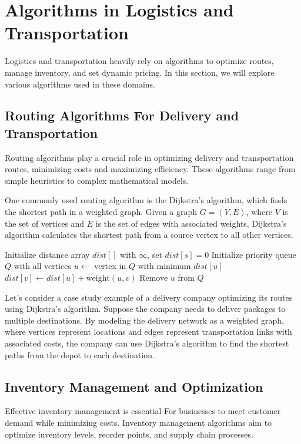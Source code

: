 \documentclass[12pt]{book} %
\begin{document}
\section{Algorithms in Logistics and Transportation}
Logistics and transportation heavily rely on algorithms to optimize routes, manage inventory, and set dynamic pricing. In this section, we will explore various algorithms used in these domains.

\subsection{Routing Algorithms For Delivery and Transportation}
Routing algorithms play a crucial role in optimizing delivery and transportation routes, minimizing costs and maximizing efficiency. These algorithms range from simple heuristics to complex mathematical models.

One commonly used routing algorithm is the Dijkstra's algorithm, which finds the shortest path in a weighted graph. Given a graph $G = (V, E)$, where $V$ is the set of vertices and $E$ is the set of edges with associated weights, Dijkstra's algorithm calculates the shortest path from a source vertex to all other vertices.
\FloatBarrier
\begin{algorithm}
\caption{Dijkstra's Algorithm}
\begin{algorithmic}[1]
\State Initialize distance array $dist[]$ with $\infty$, set $dist[s] = 0$
\State Initialize priority queue $Q$ with all vertices
    \State $u \gets$ vertex in $Q$ with minimum $dist[u]$
            \State $dist[v] \gets dist[u] + \text{weight}(u, v)$
        \EndIf
    \EndFor
    \State Remove $u$ from $Q$
\EndWhile
\EndProcedure
\end{algorithmic}
\end{algorithm}
\FloatBarrier
Let's consider a case study example of a delivery company optimizing its routes using Dijkstra's algorithm. Suppose the company needs to deliver packages to multiple destinations. By modeling the delivery network as a weighted graph, where vertices represent locations and edges represent transportation links with associated costs, the company can use Dijkstra's algorithm to find the shortest paths from the depot to each destination.

\subsection{Inventory Management and Optimization}
Effective inventory management is essential For businesses to meet customer demand while minimizing costs. Inventory management algorithms aim to optimize inventory levels, reorder points, and supply chain processes.
\end{document}
